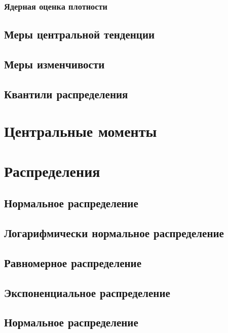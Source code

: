 \documentclass[]{scrartcl}
\begin{document}
\subsubsection{Ядерная оценка плотности}


\subsection{Меры центральной тенденции}

\subsection{Меры изменчивости}

\subsection{Квантили распределения}

\section{Центральные моменты}\label{moments}

\section{Распределения}

\subsection{Нормальное распределение}

\subsection{Логарифмически нормальное распределение}

\subsection{Равномерное распределение}

\subsection{Экспоненциальное распределение}

\subsection{Нормальное распределение}
\end{document}
